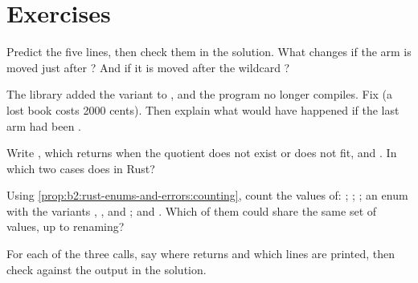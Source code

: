 \section{Exercises}\label{sec:b2:rust-enums-and-errors:exercises}

\begin{exercise}[$\star$]\label{exo:b2:rust-enums-and-errors:1}
Predict the five lines, then check them in the solution. What changes if the arm  is moved just
after ? And if it is moved after the wildcard \code{_}?
\end{exercise}

\begin{exercise}[$\star$]\label{exo:b2:rust-enums-and-errors:2}
The library added the variant  to , and the program no longer compiles. Fix
 (a lost book costs 2000 cents). Then explain what would have happened if the last arm had been
.
\end{exercise}

\begin{exercise}[$\star$]\label{exo:b2:rust-enums-and-errors:3}
Write , which returns  when the quotient does not exist
or does not fit, and . In which two cases does  
in Rust?
\end{exercise}

\begin{exercise}[$\star$]\label{exo:b2:rust-enums-and-errors:4}
Using \cref{prop:b2:rust-enums-and-errors:counting}, count the values of: ;
; ; an enum with the variants , ,
 and ; and \code{[bool; 2]}. Which of them could share the same set of values, up to
renaming?
\end{exercise}

\begin{exercise}[$\star\star$]\label{exo:b2:rust-enums-and-errors:5}
For each of the three calls, say where  returns and which lines are printed, then check against the
output in the solution.
\end{exercise}

